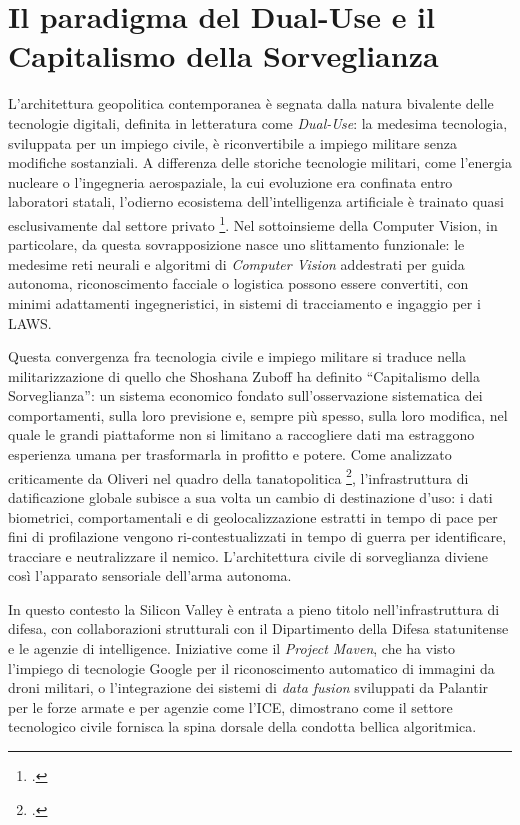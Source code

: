\documentclass[a4paper,12pt]{report}
\begin{document}
\section{Il paradigma del Dual-Use e il Capitalismo della Sorveglianza}
 
L'architettura geopolitica contemporanea è segnata dalla natura bivalente delle
tecnologie digitali, definita in letteratura come \textit{Dual-Use}: la medesima tecnologia,
sviluppata per un impiego civile, è riconvertibile a impiego militare senza
modifiche sostanziali. A
differenza delle storiche tecnologie militari, come l'energia nucleare o
l'ingegneria aerospaziale, la cui evoluzione era confinata entro laboratori statali, l'odierno ecosistema dell'intelligenza artificiale è trainato quasi
esclusivamente dal settore privato \footcite{aiindex_2024}. Nel sottoinsieme
della Computer Vision, in particolare, da questa
sovrapposizione nasce uno slittamento funzionale: le medesime reti neurali e
algoritmi di \textit{Computer Vision} addestrati per guida autonoma,
riconoscimento facciale o logistica possono essere convertiti, con minimi
adattamenti ingegneristici, in sistemi di tracciamento e ingaggio per i LAWS.
 
Questa convergenza fra tecnologia civile e impiego militare si traduce nella militarizzazione di quello che Shoshana Zuboff ha definito ``Capitalismo della Sorveglianza'': un sistema economico
fondato sull'osservazione sistematica dei comportamenti, sulla loro previsione
e, sempre più spesso, sulla loro modifica, nel quale le grandi piattaforme non
si limitano a raccogliere dati ma estraggono esperienza umana per trasformarla
in profitto e potere. Come analizzato criticamente da Oliveri nel quadro della
tanatopolitica \footcite{oliveri_2024}, l'infrastruttura di datificazione
globale subisce a sua volta un cambio di destinazione d'uso: i dati biometrici,
comportamentali e di geolocalizzazione estratti in tempo di pace per fini di
profilazione vengono ri-contestualizzati in tempo di guerra per identificare,
tracciare e neutralizzare il nemico. L'architettura civile di sorveglianza
diviene così l'apparato sensoriale dell'arma autonoma.
 
In questo contesto la Silicon Valley è entrata a pieno titolo
nell'infrastruttura di difesa, con collaborazioni strutturali con il
Dipartimento della Difesa statunitense e le agenzie di intelligence. Iniziative
come il \textit{Project Maven}, che ha visto l'impiego di tecnologie Google per
il riconoscimento automatico di immagini da droni militari, o l'integrazione dei
sistemi di \textit{data fusion} sviluppati da Palantir per le forze armate e per
agenzie come l'ICE, dimostrano come il settore tecnologico civile fornisca la
spina dorsale della condotta bellica algoritmica.
 
\end{document}
